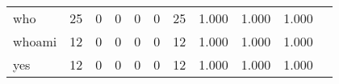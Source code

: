 \begin{longtable}{lp{1.2cm}p{1.2cm}p{1.2cm}p{1.2cm}p{1.2cm}p{1.2cm}p{1.2cm}p{1.2cm}p{1.2cm}p{1.2cm}}
who       &                                    25 &                                                  0 &                                                  0 &                                                  0 &                                                  0 &                                                 25 &                                         1.000 &                                              1.000 &                                              1.000 \\
whoami    &                                    12 &                                                  0 &                                                  0 &                                                  0 &                                                  0 &                                                 12 &                                         1.000 &                                              1.000 &                                              1.000 \\
yes       &                                    12 &                                                  0 &                                                  0 &                                                  0 &                                                  0 &                                                 12 &                                         1.000 &                                              1.000 &                                              1.000 \\
\end{longtable}

